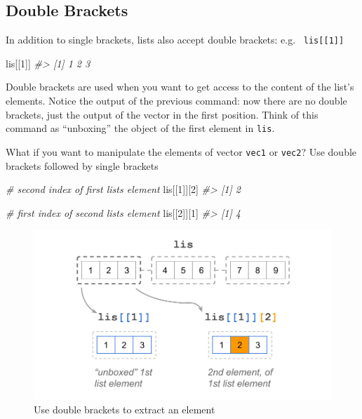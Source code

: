 \documentclass[
]{book}
\newenvironment{Shaded}{\begin{snugshade}}{\end{snugshade}}
\newcommand{\CommentTok}[1]{\textcolor[rgb]{0.56,0.35,0.01}{\textit{#1}}}
\newcommand{\DecValTok}[1]{\textcolor[rgb]{0.00,0.00,0.81}{#1}}
\newcommand{\NormalTok}[1]{#1}
\begin{document}
\hypertarget{double-brackets}{%
\subsection{Double Brackets}\label{double-brackets}}

In addition to single brackets, lists also accept double brackets: e.g.~
\texttt{lis{[}{[}1{]}{]}}

\begin{Shaded}
\begin{Highlighting}[]
\NormalTok{lis[[}\DecValTok{1}\NormalTok{]]}
\CommentTok{\#\textgreater{} [1] 1 2 3}
\end{Highlighting}
\end{Shaded}

Double brackets are used when you want to get access to the content of the
list's elements. Notice the output of the previous command: now there are no
double brackets, just the output of the vector in the first position. Think
of this command as ``unboxing'' the object of the first element in \texttt{lis}.

What if you want to manipulate the elements of vector \texttt{vec1} or \texttt{vec2}? Use
double brackets followed by single brackets

\begin{Shaded}
\begin{Highlighting}[]
\CommentTok{\# second index of first list\textquotesingle{}s element}
\NormalTok{lis[[}\DecValTok{1}\NormalTok{]][}\DecValTok{2}\NormalTok{]}
\CommentTok{\#\textgreater{} [1] 2}

\CommentTok{\# first index of second list\textquotesingle{}s element}
\NormalTok{lis[[}\DecValTok{2}\NormalTok{]][}\DecValTok{1}\NormalTok{]}
\CommentTok{\#\textgreater{} [1] 4}
\end{Highlighting}
\end{Shaded}

\begin{figure}

{\centering \includegraphics[width=0.75\linewidth]{images/objects/obj-list-brackets3} 

}

\caption{Use double brackets to extract an element}\label{fig:unnamed-chunk-129}
\end{figure}
\end{document}
